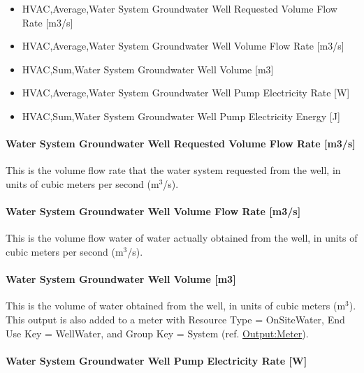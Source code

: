 \begin{itemize}
\item
  HVAC,Average,Water System Groundwater Well Requested Volume Flow Rate {[}m3/s{]}
\item
  HVAC,Average,Water System Groundwater Well Volume Flow Rate {[}m3/s{]}
\item
  HVAC,Sum,Water System Groundwater Well Volume {[}m3{]}
\item
  HVAC,Average,Water System Groundwater Well Pump Electricity Rate {[}W{]}
\item
  HVAC,Sum,Water System Groundwater Well Pump Electricity Energy {[}J{]}
\end{itemize}

\paragraph{Water System Groundwater Well Requested Volume Flow Rate {[}m3/s{]}}\label{water-system-groundwater-well-requested-volume-flow-rate-m3s}

This is the volume flow rate that the water system requested from the well, in units of cubic meters per second (m\(^{3}\)/s).

\paragraph{Water System Groundwater Well Volume Flow Rate {[}m3/s{]}}\label{water-system-groundwater-well-volume-flow-rate-m3s}

This is the volume flow water of water actually obtained from the well, in units of cubic meters per second (m\(^{3}\)/s).

\paragraph{Water System Groundwater Well Volume {[}m3{]}}\label{water-system-groundwater-well-volume-m3}

This is the volume of water obtained from the well, in units of cubic meters (m\(^{3}\)). This output is also added to a meter with Resource Type = OnSiteWater, End Use Key = WellWater, and Group Key = System (ref. \hyperref[outputmeter-and-outputmetermeterfileonly]{Output:Meter}).

\paragraph{Water System Groundwater Well Pump Electricity Rate {[}W{]}}\label{water-system-groundwater-well-pump-electric-power-w}

